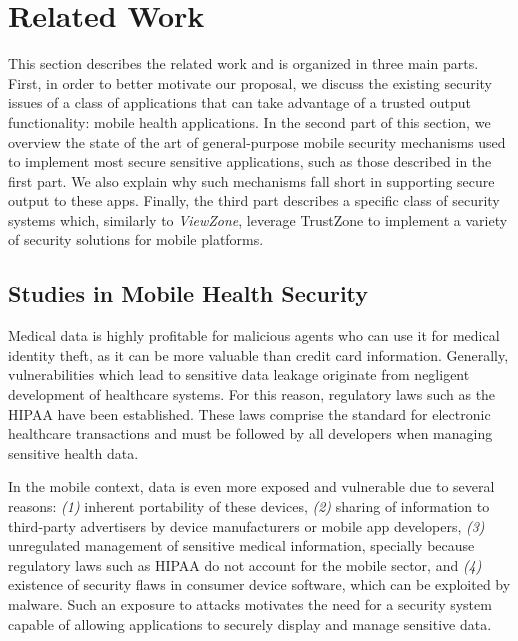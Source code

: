 
% 
% 
\section{Related Work}
\label{sec:relatedWork}

This section describes the related work and is organized in three main parts. First, in order to better motivate our proposal, we discuss the existing security issues of a class of applications that can take advantage of a trusted output functionality: mobile health applications. In the second part of this section, we overview the state of the art of general-purpose mobile security mechanisms used to implement most secure sensitive applications, such as those described in the first part. We also explain why such mechanisms fall short in supporting secure output to these apps. Finally, the third part describes a specific class of security systems which, similarly to \emph{ViewZone}, leverage TrustZone to implement a variety of security solutions for mobile platforms.

\subsection{Studies in Mobile Health Security}
\label{sec:mhealth}

Medical data is highly profitable for malicious agents who can use it for medical identity theft, as it can be more valuable than credit card information. Generally, vulnerabilities which lead to sensitive data leakage originate from negligent development of healthcare systems. For this reason, regulatory laws such as the \ac{HIPAA} have been established. These laws comprise the standard for electronic healthcare transactions and must be followed by all developers when managing sensitive health data.

In the mobile context, data is even more exposed and vulnerable due to several reasons: \emph{(1)} inherent portability of these devices, \emph{(2)} sharing of information to third-party advertisers by device manufacturers or mobile app developers, \emph{(3)} unregulated management of sensitive medical information, specially because regulatory laws such as \ac{HIPAA} do not account for the mobile sector, and \emph{(4)} existence of security flaws in consumer device software, which can be exploited by malware. Such an exposure to attacks motivates the need for a security system capable of allowing applications to securely display and manage sensitive data.

